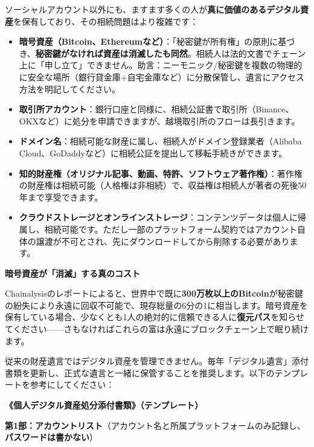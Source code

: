 
ソーシャルアカウント以外にも、ますます多くの人が\textbf{真に価値のあるデジタル資産}を保有しており、その相続問題はより複雑です：

\begin{itemize}
  \item \textbf{暗号資産（Bitcoin、Ethereumなど）}：「秘密鍵が所有権」の原則に基づき、\textbf{秘密鍵がなければ資産は消滅したも同然}。相続人は法的文書でチェーン上に「申し立て」できません。助言：ニーモニック/秘密鍵を複数の物理的に安全な場所（銀行貸金庫+自宅金庫など）に分散保管し、遺言にアクセス方法を明記してください。
  \item \textbf{取引所アカウント}：銀行口座と同様に、相続公証書で取引所（Binance、OKXなど）に処分を申請できますが、越境取引所のフローは長引きます。
  \item \textbf{ドメイン名}：相続可能な財産に属し、相続人がドメイン登録業者（Alibaba Cloud、GoDaddyなど）に相続公証を提出して移転手続きができます。
  \item \textbf{知的財産権（オリジナル記事、動画、特許、ソフトウェア著作権）}：著作権の財産権は相続可能（人格権は非相続）で、収益権は相続人が著者の死後50年まで享受できます。
  \item \textbf{クラウドストレージとオンラインストレージ}：コンテンツデータは個人に帰属し、相続可能です。ただし一部のプラットフォーム契約ではアカウント自体の譲渡が不可とされ、先にダウンロードしてから削除する必要があります。
\end{itemize}

\textbf{暗号資産が「消滅」する真のコスト}\par

Chainalysisのレポートによると、世界中で既に\textbf{300万枚以上のBitcoin}が秘密鍵の紛失により永遠に回収不可能で、現存総量の6分の1に相当します。暗号資産を保有している場合、少なくとも1人の絶対的に信頼できる人に\textbf{復元パス}を知らせてください——さもなければこれらの富は永遠にブロックチェーン上で眠り続けます。


従来の財産遺言ではデジタル資産を管理できません。毎年「デジタル遺言」添付書類を更新し、正式な遺言と一緒に保管することを推奨します。以下のテンプレートを参考にしてください：

\textbf{《個人デジタル資産処分添付書類》（テンプレート）}\par

\textbf{第1部：アカウントリスト}（アカウント名と所属プラットフォームのみ記録し、\textbf{パスワードは書かない}）

